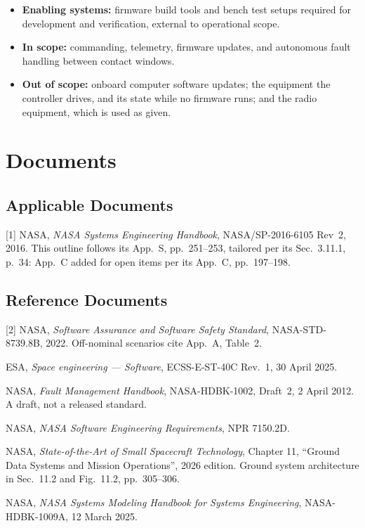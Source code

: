 \documentclass[11pt,a4paper]{article}
\begin{document}
\begin{itemize}
\item \textbf{Enabling systems:} firmware build tools and bench test setups
  required for development and verification, external to operational scope.
\item \textbf{In scope:} commanding, telemetry, firmware updates, and autonomous
  fault handling between contact windows.
\item \textbf{Out of scope:} onboard computer software updates; the
  equipment the controller drives, and its state while no firmware runs; and
  the radio equipment, which is used as given.
\end{itemize}

\section{Documents}

\subsection{Applicable Documents}
[1] NASA, \emph{NASA Systems Engineering Handbook}, NASA/SP-2016-6105 Rev~2,
2016. This outline follows its App.~S, pp.~251--253, tailored per its
Sec.~3.11.1, p.~34: App.~C added for open items per its
App.~C, pp.~197--198.

\subsection{Reference Documents}
[2] NASA, \emph{Software Assurance and Software Safety Standard},
NASA-STD-8739.8B, 2022. Off-nominal scenarios cite App.~A, Table~2.

\noindent [3] ESA, \emph{Space engineering --- Software}, ECSS-E-ST-40C Rev.~1,
30 April 2025.

\noindent [4] NASA, \emph{Fault Management Handbook}, NASA-HDBK-1002, Draft~2,
2 April 2012. A draft, not a released standard.

\noindent [5] NASA, \emph{NASA Software Engineering Requirements}, NPR 7150.2D.

\noindent [6] NASA, \emph{State-of-the-Art of Small Spacecraft Technology},
Chapter 11, ``Ground Data Systems and Mission Operations'', 2026 edition.
Ground system architecture in Sec.~11.2 and Fig.~11.2, pp.~305--306.

\noindent [7] NASA, \emph{NASA Systems Modeling Handbook for Systems Engineering},
NASA-HDBK-1009A, 12 March 2025.
\end{document}
